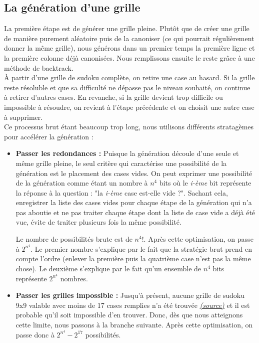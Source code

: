 \documentclass[a4paper]{article}
\begin{document}
\newpage
\subsection{La génération d'une grille}
\begin{justify}
    \qquad La première étape est de générer une grille pleine. Plutôt que de créer une grille de manière purement aléatoire puis de la canoniser (ce qui pourrait régulièrement donner la même grille), nous générons dans un premier temps la première ligne et la première colonne déjà canonisées. Nous remplissons ensuite le reste grâce à une méthode de backtrack. \\
    
    À partir d’une grille de sudoku complète, on retire une case au hasard. Si la grille reste résoluble et que sa difficulté ne dépasse pas le niveau souhaité, on continue à retirer d’autres cases. En revanche, si la grille devient trop difficile ou impossible à résoudre, on revient à l’étape précédente et on choisit une autre case à supprimer. 
    \mbox{}\\[0.5em]
    \noindent Ce processus brut étant beaucoup trop long, nous utilisons différents stratagèmes pour accélérer la génération :
    \begin{itemize}
        \hypertarget{redondances}{}
        \item \textbf{Passer les redondances :} Puisque la génération découle d'une seule et même grille pleine, le seul critère qui caractérise une possibilité de la génération est le placement des cases vides. On peut exprimer une possibilité de la génération comme étant un nombre à $n^4$ bits où le \textit{i-ème} bit représente la réponse à la question : "la \textit{i-ème} case est-elle vide ?". Sachant cela, enregistrer la liste des cases vides pour chaque étape de la génération qui n'a pas aboutie et ne pas traiter chaque étape dont la liste de case vide a déjà été vue, évite de traiter plusieurs fois la même possibilité.

        Le nombre de possibilités brute est de $n^4!$. Après cette optimisation, on passe à $2^{n^4}$. Le premier nombre s'explique par le fait que la stratégie brut prend en compte l'ordre (enlever la première puis la quatrième case n'est pas la même chose). Le deuxième s'explique par le fait qu'un ensemble de $n^4$ bits représente $2^{n^4}$ nombres.

        \hypertarget{minimal}{}
        \item \textbf{Passer les grilles impossible :} Jusqu'à présent, aucune grille de sudoku 9x9 valable avec moins de 17 cases remplies n'a été trouvée \href{https://fr.wikipedia.org/wiki/Sudoku#Structure_logique}{\textit{(source)}} et il est probable qu'il soit impossible d'en trouver. Donc, dès que nous atteignons cette limite, nous passons à la branche suivante.
        \noindent Après cette optimisation, on passe donc à $2^{n^4} - 2^{17}$ possibilités.


\end{itemize}
\end{justify}
\end{document}
